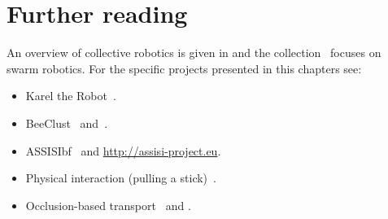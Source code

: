 \section{Further reading}

An overview of collective robotics is given in \cite{kernbach2013handbook} and the collection~\cite{sahin2005} focuses on swarm robotics. For the specific projects presented in this chapters see:
\begin{itemize}
\item Karel the Robot~\cite{karel}.
\item BeeClust~\cite{bodi2012interaction} and~\cite{Schmickl2009}.
\item ASSISIbf~\cite{schmickl2013assisi} and \url{http://assisi-project.eu}.
\item Physical interaction (pulling a stick)~\cite{Ijspeert2001}.
\item Occlusion-based transport~\cite{chen2013strategy} and \cite{gross2015}.
\end{itemize}
